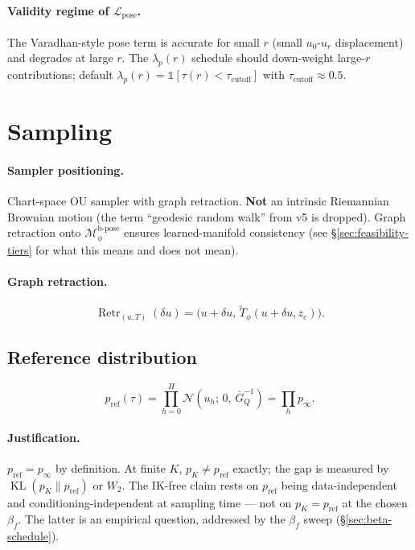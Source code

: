 \documentclass[11pt,a4paper]{article}
\DeclareMathOperator{\Retr}{Retr}
\DeclareMathOperator{\KL}{KL}
\newcommand{\N}{\mathcal{N}}
\newcommand{\Loss}{\mathcal{L}}
\newcommand{\Mbpose}{\mathcal{M}_\phi^{\text{b-pose}}}
\newcommand{\GQbar}{\bar G_Q}
\begin{document}
\paragraph{Validity regime of $\Loss_\text{pose}$.} The Varadhan-style pose term is accurate for small $r$ (small $u_0$-$u_r$ displacement) and degrades at large $r$. The $\lambda_p(r)$ schedule should down-weight large-$r$ contributions; default $\lambda_p(r) = \mathbb{1}[\tau(r) < \tau_\text{cutoff}]$ with $\tau_\text{cutoff} \approx 0.5$.

\section{Sampling}
\label{sec:sampling}

\paragraph{Sampler positioning.} Chart-space OU sampler with graph retraction. \textbf{Not} an intrinsic Riemannian Brownian motion (the term ``geodesic random walk'' from v5 is dropped). Graph retraction onto $\Mbpose$ ensures learned-manifold consistency (see \S\ref{sec:feasibility-tiers} for what this means and does not mean).

\paragraph{Graph retraction.}
\begin{equation}
\Retr_{(u, T)}(\delta u) = \bigl(u + \delta u,\, \widetilde T_\phi(u + \delta u, z_e)\bigr).
\end{equation}

\subsection{Reference distribution}
\label{sec:reference-distribution}

\begin{equation}
\boxed{ p_\text{ref}(\tau) = \prod_{h=0}^H \N(u_h;\, 0,\, \GQbar^{-1}) = \prod_h p_\infty. }
\end{equation}

\paragraph{Justification.} $p_\text{ref} = p_\infty$ by definition. At finite $K$, $p_K \neq p_\text{ref}$ exactly; the gap is measured by $\KL(p_K \| p_\text{ref})$ or $W_2$. The IK-free claim rests on $p_\text{ref}$ being data-independent and conditioning-independent at sampling time — not on $p_K = p_\text{ref}$ at the chosen $\beta_f$. The latter is an empirical question, addressed by the $\beta_f$ sweep (\S\ref{sec:beta-schedule}).
\end{document}
